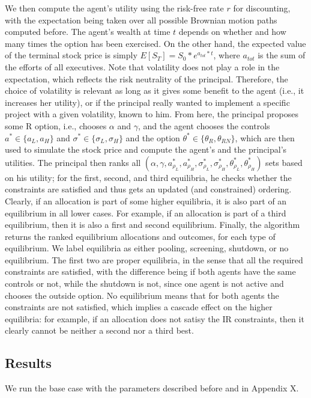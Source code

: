 We then compute the agent's utility using the risk-free rate $r$ for discounting, with the expectation being taken over all possible Brownian motion paths computed before. The agent's wealth at time $t$ depends on whether and how many times the option has been exercised. On the other hand, the expected value of the terminal stock price is simply $E[S_T] = S_0 * e^{a_{tot}*t}$, where $a_{tot}$ is the sum of the efforts of all executives. Note that volatility does not play a role in the expectation, which reflects the risk neutrality of the principal. Therefore, the choice of volatility is relevant as long as it gives some benefit to the agent (i.e., it increases her utility), or if the principal really wanted to implement a specific project with a given volatility, known to him.
From here, the principal proposes some R option, i.e., chooses $\alpha$ and $\gamma$, and the agent chooses the controls $a^* \in \{a_L, a_H\}$ and $\sigma^* \in \{\sigma_L, \sigma_H\}$ and the option $\theta^* \in \{ \theta_R, \theta_{RN} \}$, which are then used to simulate the stock price and compute the agent's and the principal's utilities. The principal then ranks all $(\alpha, \gamma, a^*_{\rho_L}, a^*_{\rho_H}, \sigma^*_{\rho_L}, \sigma^*_{\rho_H}, \theta^*_{\rho_L}, \theta^*_{\rho_H})$ sets based on his utility; for the first, second, and third equilibria, he checks whether the constraints are satisfied and thus gets an updated (and constrained) ordering. Clearly, if an allocation is part of some higher equilibria, it is also part of an equilibrium in all lower cases. For example, if an allocation is part of a third equilibrium, then it is also a first and second equilibrium. Finally, the algorithm returns the ranked equilibrium allocations and outcomes, for each type of equilibrium. We label equilibria as either pooling, screening, shutdown, or no equilibrium. The first two are proper equilibria, in the sense that all the required constraints are satisfied, with the difference being if both agents have the same controls or not, while the shutdown is not, since one agent is not active and chooses the outside option. No equilibrium means that for both agents the constraints are not satisfied, which implies a cascade effect on the higher equilibria: for example, if an allocation does not satisy the IR constraints, then it clearly cannot be neither a second nor a third best.


\subsection{Results} 
We run the base case with the parameters described before and in Appendix X. %


